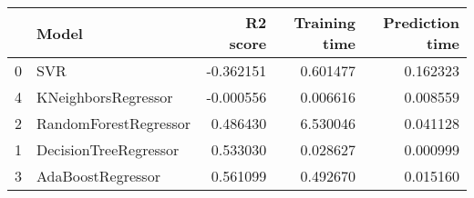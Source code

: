 \begin{tabular}{llrrr}
\toprule
 & Model & R2 score & Training time & Prediction time \\
\midrule
0 & SVR & -0.362151 & 0.601477 & 0.162323 \\
4 & KNeighborsRegressor & -0.000556 & 0.006616 & 0.008559 \\
2 & RandomForestRegressor & 0.486430 & 6.530046 & 0.041128 \\
1 & DecisionTreeRegressor & 0.533030 & 0.028627 & 0.000999 \\
3 & AdaBoostRegressor & 0.561099 & 0.492670 & 0.015160 \\
\bottomrule
\end{tabular}
